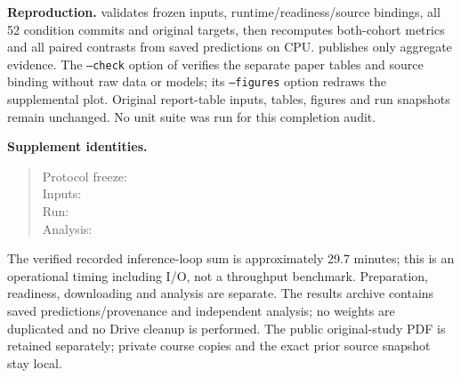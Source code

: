 {\raggedright
\textbf{Reproduction.}  validates frozen
inputs, runtime/readiness/source bindings, all 52 condition commits and original
targets, then recomputes both-cohort metrics and all paired contrasts from saved
predictions on CPU.  publishes only
aggregate evidence. The \texttt{--check} option of
verifies the separate paper tables and source binding without raw data or models;
its \texttt{--figures} option redraws the supplemental plot. Original report-table inputs,
tables, figures and run snapshots remain unchanged. No unit suite was run for
this completion audit.
\par}

\textbf{Supplement identities.}
\begin{quote}\footnotesize\raggedright
Protocol freeze: \\
Inputs: \\
Run: \\
Analysis: 
\end{quote}
The verified recorded inference-loop sum is approximately 29.7 minutes; this is
an operational timing including I/O, not a throughput benchmark. Preparation,
readiness, downloading and analysis are separate. The results archive contains
saved predictions/provenance and independent analysis; no weights are duplicated
and no Drive cleanup is performed. The public original-study PDF is retained
separately; private course copies and the exact prior source snapshot stay local.
